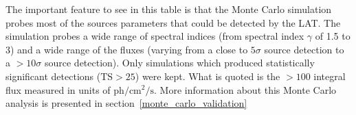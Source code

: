 \documentclass[12pt,preprint]{aastex}
\newcommand{\mev}{\text{MeV}\xspace}
\newcommand{\s}{\text{s}\xspace}
\newcommand{\ph}{\text{ph}\xspace}
\newcommand{\cm}{\text{cm}\xspace}
\newcommand{\ts}{\text{TS}\xspace}
\begin{document}
\begin{table}
\begin{centering}
{    The important feature to see in this table is that the Monte Carlo
    simulation probes most of the sources parameters that could be detected
    by the LAT.  The simulation probes a wide range of spectral indices
    (from spectral index $\gamma$ of 1.5 to 3) and a wide range of the fluxes
    (varying from a close to $5\sigma$ source detection to a $>10\sigma$
    source detection).  Only simulations which produced statistically
    significant detections ($\ts>25$) were kept.  What is quoted is the
    $>100$ \mev integral flux measured in units of $\ph/\cm^2/\s$.
    More information about this Monte Carlo analysis is presented in
    section~\ref{monte_carlo_validation}
    }
    \label{ts_ext_num_sims}
  \end{centering}
\end{table}

\clearpage
\end{document}
